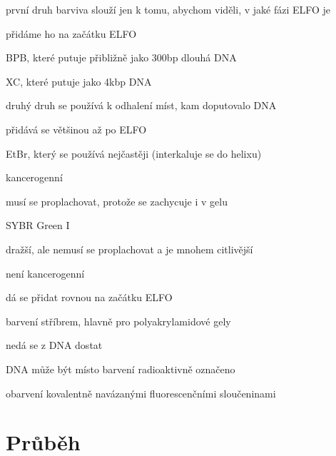 \documentclass[DIV=8]{scrreprt}
\begin{document}
\begin{myItemize}[nosep]
    \item první druh barviva slouží jen k tomu, abychom viděli, v jaké fázi ELFO je
\begin{myItemize}[nosep]
    \item přidáme ho na začátku ELFO
    \item BPB, které putuje přibližně jako 300bp dlouhá DNA
    \item XC, které putuje jako 4kbp DNA
\end{myItemize}

    \item druhý druh se používá k odhalení míst, kam doputovalo DNA
\begin{myItemize}[nosep]
    \item přidává se většinou až po ELFO
    \item EtBr, který se používá nejčastěji (interkaluje se do helixu)
\begin{myItemize}[nosep]
    \item kancerogenní
    \item musí se proplachovat, protože se zachycuje i v gelu
\end{myItemize}

    \item SYBR Green I
\begin{myItemize}[nosep]
    \item dražší, ale nemusí se proplachovat a je mnohem citlivější
    \item není kancerogenní
    \item dá se přidat rovnou na začátku ELFO
\end{myItemize}

    \item barvení stříbrem, hlavně pro polyakrylamidové gely
\begin{myItemize}[nosep]
    \item nedá se z DNA dostat
\end{myItemize}

    \item DNA může být místo barvení radioaktivně označeno
    \item obarvení kovalentně navázanými fluorescenčními sloučeninami
\end{myItemize}

\end{myItemize}



\section{Průběh} \label{Průběh} \FloatBarrier
\end{document}
